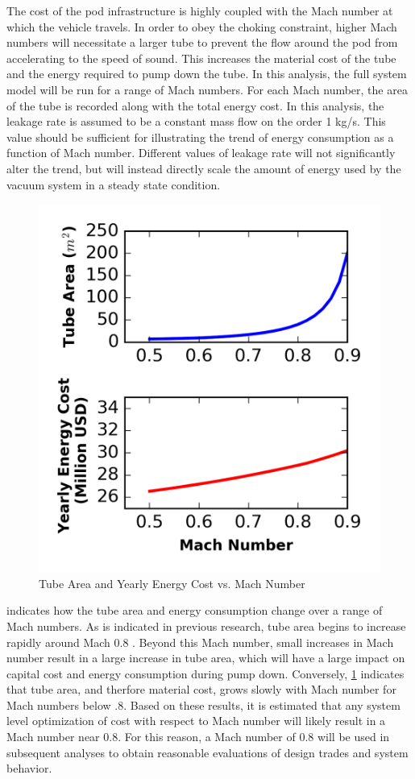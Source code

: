 The cost of the pod infrastructure is highly coupled with the
Mach number at which the vehicle travels. In order to obey the choking constraint,
higher Mach numbers will necessitate a larger tube to prevent the flow around
the pod from accelerating to the speed of sound. This increases the material
cost of the tube and the energy required to pump down the tube. In this analysis,
the full system model will be run for a range of Mach numbers.
For each Mach number, the area of the tube is recorded along with the total energy cost.
In this analysis, the leakage rate is assumed to be a constant mass flow on the order 1 kg/s.
This value should be sufficient for illustrating the trend of energy
consumption as a function of Mach number. Different values of leakage rate will
not significantly alter the trend, but will instead directly scale the amount
of energy used by the vacuum system in a steady state condition.
\begin{figure}
	\centering
	\includegraphics{../../images/graphs/mach_trades/pressure_vs_mach.png}
	\caption{Tube Area and Yearly Energy Cost vs. Mach Number}
	\label{fig:tube_area_cost_vs_mach}
\end{figure}
 indicates how the tube area and energy
consumption change over a range of Mach numbers. As is indicated in previous research,
tube area begins to increase rapidly around Mach 0.8 \cite{Chin}.
Beyond this Mach number, small increases in Mach number result in a large
increase in tube area, which will have a large impact on capital cost and energy
consumption during pump down. Conversely, \cref{fig:tube_area_cost_vs_mach}
indicates that tube area, and therfore material cost,
grows slowly with Mach number for Mach numbers below .8.  
Based on these results, it is estimated that any
system level optimization of cost with respect to Mach number will likely result in a
Mach number near 0.8. For this reason, a Mach number of 0.8 will be used in
subsequent analyses to obtain reasonable evaluations of design trades and system behavior.
